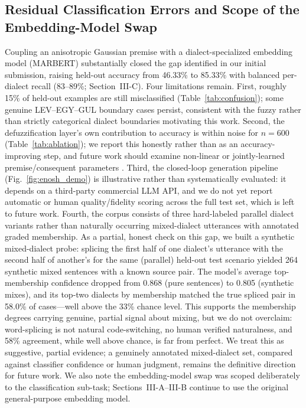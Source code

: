\documentclass[conference]{IEEEtran}
\begin{document}
\subsection{Residual Classification Errors and Scope of the Embedding-Model Swap}
Coupling an anisotropic Gaussian premise with a dialect-specialized embedding model (MARBERT) substantially closed the gap identified in our initial submission, raising held-out accuracy from 46.33\% to 85.33\% with balanced per-dialect recall (83--89\%; Section~III-C). Four limitations remain. First, roughly 15\% of held-out examples are still misclassified (Table~\ref{tab:confusion}); some genuine LEV--EGY--GUL boundary cases persist, consistent with the fuzzy rather than strictly categorical dialect boundaries motivating this work. Second, the defuzzification layer's own contribution to accuracy is within noise for $n=600$ (Table~\ref{tab:ablation}); we report this honestly rather than as an accuracy-improving step, and future work should examine non-linear or jointly-learned premise/consequent parameters \cite{jang1993}. Third, the closed-loop generation pipeline (Fig.~\ref{fig:enosh_demo}) is illustrative rather than systematically evaluated: it depends on a third-party commercial LLM API, and we do not yet report automatic or human quality/fidelity scoring across the full test set, which is left to future work. Fourth, the corpus consists of three hard-labeled parallel dialect variants rather than naturally occurring mixed-dialect utterances with annotated graded membership. As a partial, honest check on this gap, we built a synthetic mixed-dialect probe: splicing the first half of one dialect's utterance with the second half of another's for the same (parallel) held-out test scenario yielded 264 synthetic mixed sentences with a known source pair. The model's average top-membership confidence dropped from 0.868 (pure sentences) to 0.805 (synthetic mixes), and its top-two dialects by membership matched the true spliced pair in 58.0\% of cases---well above the 33\% chance level. This supports the membership degrees carrying genuine, partial signal about mixing, but we do not overclaim: word-splicing is not natural code-switching, no human verified naturalness, and 58\% agreement, while well above chance, is far from perfect. We treat this as suggestive, partial evidence; a genuinely annotated mixed-dialect set, compared against classifier confidence or human judgment, remains the definitive direction for future work. We also note the embedding-model swap was scoped deliberately to the classification sub-task; Sections~III-A--III-B continue to use the original general-purpose embedding model.
\end{document}
